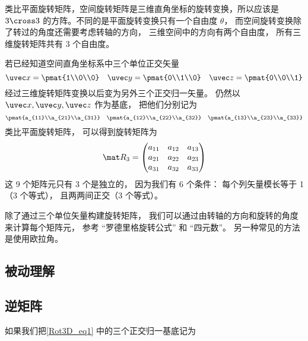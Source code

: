 
\begin{issues}
\issueDraft
\end{issues}


类比平面旋转矩阵，空间旋转矩阵是三维直角坐标的旋转变换，所以应该是 $3 \cross 3$ 的方阵。不同的是平面旋转变换只有一个自由度 $\theta $， 而空间旋转变换除了转过的角度还需要考虑转轴的方向， 三维空间中的方向有两个自由度， 所有三维旋转矩阵共有 3 个自由度。

若已经知道空间直角坐标系中三个单位正交矢量
\begin{equation}
\uvec x=\pmat{1\\0\\0} \quad \uvec y=\pmat{0\\1\\0} \quad \uvec z=\pmat{0\\0\\1}
\end{equation}
经过三维旋转矩阵变换以后变为另外三个正交归一矢量。 仍然以 $\uvec x, \uvec y, \uvec z$ 作为基底， 把他们分别记为
\begin{equation}\label{Rot3D_eq1}
\pmat{a_{11}\\a_{21}\\a_{31}} \quad \pmat{a_{12}\\a_{22}\\a_{32}} \quad \pmat{a_{13}\\a_{23}\\a_{33}}
\end{equation}
类比平面旋转矩阵， 可以得到旋转矩阵为
\begin{equation}
\mat R_3 = \begin{pmatrix}
{a_{11}}&{a_{12}}&{a_{13}}\\
{a_{21}}&{a_{22}}&{a_{23}}\\
{a_{31}}&{a_{32}}&{a_{33}}
\end{pmatrix}\end{equation}
这 9 个矩阵元只有 3 个是独立的， 因为我们有 6 个条件： 每个列矢量模长等于 1（3 个等式）， 且两两间正交（3 个等式）。

除了通过三个单位矢量构建旋转矩阵， 我们可以通过由转轴的方向和旋转的角度来计算每个矩阵元， 参考 “罗德里格旋转公式” 和 “四元数”。 另一种常见的方法是使用欧拉角。


\subsection{被动理解}


\subsection{逆矩阵}
如果我们把\autoref{Rot3D_eq1} 中的三个正交归一基底记为 

